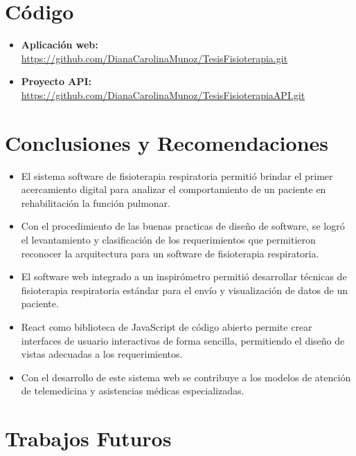 \documentclass[12pt]{article}
\begin{document}
\section{Código}

\begin{itemize}
    \item \textbf{Aplicación web:} \url{https://github.com/DianaCarolinaMunoz/TesisFisioterapia.git}
    \item \textbf{Proyecto API:} \url{https://github.com/DianaCarolinaMunoz/TesisFisioterapiaAPI.git}
\end{itemize}








\section{Conclusiones y Recomendaciones}
\begin{itemize}
    \item El sistema software de fisioterapia respiratoria permitió brindar el primer acercamiento digital para analizar el comportamiento de un paciente en rehabilitación la función pulmonar.
    
    \item Con el procedimiento de las buenas practicas de diseño de software, se logró el levantamiento y clasificación de los requerimientos que permitieron reconocer la arquitectura para un software de fisioterapia respiratoria.

    \item El software web integrado a un inspirómetro permitió desarrollar técnicas de fisioterapia  respiratoria estándar para el envío y visualización de datos de un paciente.
    
    \item React como biblioteca de JavaScript de código abierto permite crear interfaces de usuario interactivas de forma sencilla, permitiendo el diseño de vistas adecuadas a los requerimientos.
    
    \item Con el desarrollo de este sistema web se contribuye a los modelos de atención de telemedicina y asistencias médicas especializadas.
    
    
\end{itemize}


\section{Trabajos Futuros}
\end{document}
